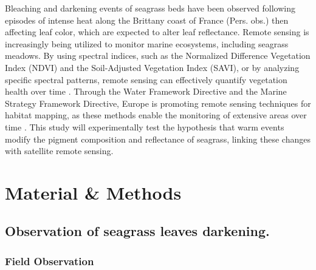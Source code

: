 \documentclass[
  number]{elsarticle}
\begin{document}
Bleaching and darkening events of seagrass beds have been observed
following episodes of intense heat along the Brittany coast of France
(Pers. obs.) then affecting leaf color, which are expected to alter leaf
reflectance. Remote sensing is increasingly being utilized to monitor
marine ecosystems, including seagrass meadows. By using spectral
indices, such as the Normalized Difference Vegetation Index (NDVI) and
the Soil-Adjusted Vegetation Index (SAVI), or by analyzing specific
spectral patterns, remote sensing can effectively quantify vegetation
health over time
\citep{huete2012vegetation, kloos2021agricultural, carlan2020identifying, akbar2020mangrove}.
Through the Water Framework Directive and the Marine Strategy Framework
Directive, Europe is promoting remote sensing techniques for habitat
mapping, as these methods enable the monitoring of extensive areas over
time \citep{papathanasopoulou2019satellite}. This study will
experimentally test the hypothesis that warm events modify the pigment
composition and reflectance of seagrass, linking these changes with
satellite remote sensing.

\section{Material \& Methods}\label{material-methods}

\subsection{Observation of seagrass leaves
darkening.}\label{observation-of-seagrass-leaves-darkening.}

\subsubsection{Field Observation}\label{field-observation}
\end{document}
